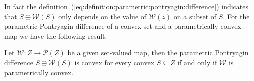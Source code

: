 \documentclass[smallextended]{svjour3}       %
\numberwithin{equation}{section}
\begin{document}
%
In fact the definition~(\ref{eq:definition:parametric:pontryagin:difference}) indicates that $S\ominus \mathcal{W}(S)$ only depends on the value of $\mathcal{W}(z)$ on a subset of $S$. 
%
%
For the parametric Pontryagin difference of a convex set and a parametrically convex map we 
have the following result.
%
\begin{theorem}\label{thm:convexity:of:pontryagin:difference}
Let $\mathcal W: Z\rightarrow\mathscr P(Z)$ be a given set-valued map, then the parametric Pontryagin difference $S \ominus \mathcal W(S)$ is convex for every convex $S\subseteq Z$ if and only if $\mathcal W$ is parametrically convex.
\end{theorem}
%
\end{document}
